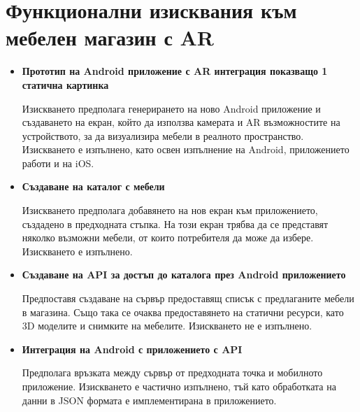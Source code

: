 \section{Функционални изисквания към мебелен магазин с AR}

\begin{itemize}
    \item \textbf{Прототип на Android приложение с AR интеграция показващо 1 статична картинка}\par
    Изискването предполага генерирането на ново Android приложение и създаването на екран, който да използва камерата и AR възможностите на устройството, за да визуализира мебели в реалното пространство. Изискването е изпълнено, като освен изпълнение на Android, приложението работи и на iOS.

    \item \textbf{Създаване на каталог с мебели}\par
    Изискването предполага добавянето на нов екран към приложението, създадено в предходната стъпка. На този екран трябва да се представят няколко възможни мебели, от които потребителя да може да избере. Изискването е изпълнено.

    \item \textbf{Създаване на API за достъп до каталога през Android приложението}\par
    Предпоставя създаване на сървър предоставящ списък с предлаганите мебели в магазина. Също така се очаква предоставянето на статични ресурси, като 3D моделите и снимките на мебелите. Изискването не е изпълнено.

    \item \textbf{Интеграция на Android с приложението с API}\par
    Предполага връзката между сървър от предходната точка и мобилното приложение. Изискването е частично изпълнено, тъй като обработката на данни в JSON формата е имплементирана в приложението.
\end{itemize}